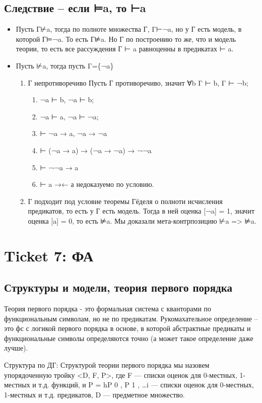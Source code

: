 \documentclass[11pt]{article}
\begin{document}
\subsection{Следствие – если ⊨a, то ⊢a}
\label{sec-8-8}
\begin{itemize}
\item Пусть Г⊬a, тогда по полноте множества Г, Γ⊢¬a, но
у Г есть модель, в которой Г⊨¬a. То есть Г⊭a.
Но Г по построению то же, что и модель теории, то есть
все рассуждения Г ⊢ a равноценны в предикатах ⊢ a.
\item Пусть ⊬a, тогда пусть Γ=\{¬a\}
\begin{enumerate}
\item Г непротиворечиво
Пусть Г противоречиво, значит ∀b Γ ⊢ b, Γ ⊢ ¬b;
\begin{enumerate}
\item ¬a ⊢ b, ¬a ⊢ b;
\item ¬a ⊢ a, ¬a ⊢ ¬a;
\item ⊢ ¬a → a, ¬a → ¬a
\item ⊢ (¬a → a) → (¬a → ¬a) → ¬¬a
\item ⊢ ¬¬a → a
\item ⊢ a          →← а недоказуемо по условию.
\end{enumerate}
\item Г подходит под условие теоремы Гёделя о полноти
исчисления предикатов, то есть у Г есть модель.
Тогда в ней оценка [¬a] = 1, значит оценка [a] = 0,
то есть ⊭a. Мы доказали мета-контрпозицию ⊬a => ⊭a.
\end{enumerate}
\end{itemize}
\section{Ticket 7: ФА}
\label{sec-9}
\subsection{Структуры и модели, теория первого порядка}
\label{sec-9-1}
Теория первого порядка - это формальная система с кванторами по
функциональным символам, но не по предикатам. Рукомахательное
определение – это фс с логикой первого порядка в основе, в которой
абстрактные предикаты и функциональные символы определяются точно
(а может такое определение даже лучше).

Структура по ДГ:
Структурой теории первого порядка мы назовем упорядоченную тройку
<D, F, P>, где F — списки оценок для 0-местных, 1-местных и т.д.
функций, и P = hP 0 , P 1 , \ldots{}i — списки оценок для 0-местных,
1-местных и т.д. предикатов, D — предметное множество.
\end{document}

